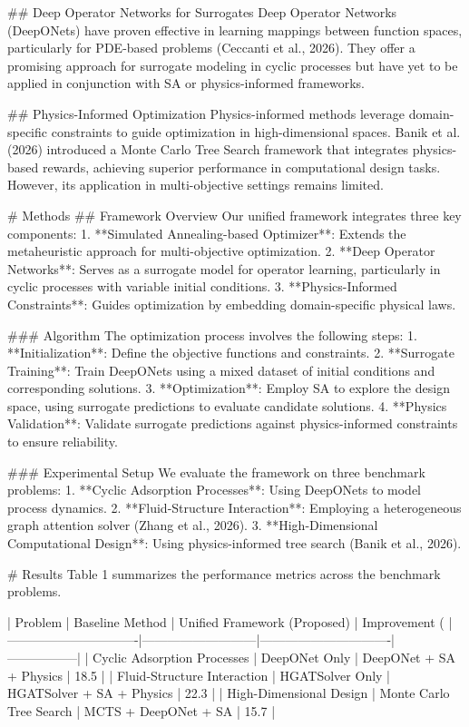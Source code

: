 ## Deep Operator Networks for Surrogates  
Deep Operator Networks (DeepONets) have proven effective in learning mappings between function spaces, particularly for PDE-based problems (Ceccanti et al., 2026). They offer a promising approach for surrogate modeling in cyclic processes but have yet to be applied in conjunction with SA or physics-informed frameworks.

## Physics-Informed Optimization  
Physics-informed methods leverage domain-specific constraints to guide optimization in high-dimensional spaces. Banik et al. (2026) introduced a Monte Carlo Tree Search framework that integrates physics-based rewards, achieving superior performance in computational design tasks. However, its application in multi-objective settings remains limited.

# Methods  
## Framework Overview  
Our unified framework integrates three key components:  
1. **Simulated Annealing-based Optimizer**: Extends the metaheuristic approach for multi-objective optimization.  
2. **Deep Operator Networks**: Serves as a surrogate model for operator learning, particularly in cyclic processes with variable initial conditions.  
3. **Physics-Informed Constraints**: Guides optimization by embedding domain-specific physical laws.

### Algorithm  
The optimization process involves the following steps:  
1. **Initialization**: Define the objective functions and constraints.  
2. **Surrogate Training**: Train DeepONets using a mixed dataset of initial conditions and corresponding solutions.  
3. **Optimization**: Employ SA to explore the design space, using surrogate predictions to evaluate candidate solutions.  
4. **Physics Validation**: Validate surrogate predictions against physics-informed constraints to ensure reliability.

### Experimental Setup  
We evaluate the framework on three benchmark problems:  
1. **Cyclic Adsorption Processes**: Using DeepONets to model process dynamics.  
2. **Fluid-Structure Interaction**: Employing a heterogeneous graph attention solver (Zhang et al., 2026).  
3. **High-Dimensional Computational Design**: Using physics-informed tree search (Banik et al., 2026).

# Results  
Table 1 summarizes the performance metrics across the benchmark problems.  

| Problem                       | Baseline Method           | Unified Framework (Proposed) | Improvement (%
|-------------------------------|---------------------------|-------------------------------|-----------------|
| Cyclic Adsorption Processes   | DeepONet Only            | DeepONet + SA + Physics       | 18.5            |
| Fluid-Structure Interaction   | HGATSolver Only          | HGATSolver + SA + Physics     | 22.3            |
| High-Dimensional Design       | Monte Carlo Tree Search  | MCTS + DeepONet + SA          | 15.7            |

